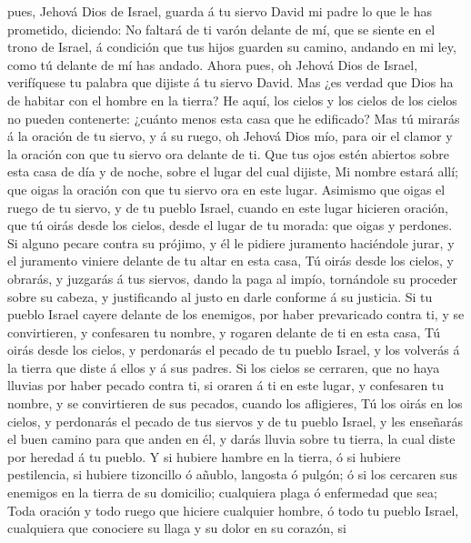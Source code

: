 pues, Jehová Dios de Israel, guarda á tu siervo David mi padre lo que le
has prometido, diciendo: No faltará de ti varón delante de mí, que se
siente en el trono de Israel, á condición que tus hijos guarden su
camino, andando en mi ley, como tú delante de mí has andado.
 Ahora pues, oh Jehová Dios de Israel, verifíquese tu
palabra que dijiste á tu siervo David.  Mas ¿es verdad
que Dios ha de habitar con el hombre en la tierra? He aquí, los cielos y
los cielos de los cielos no pueden contenerte: ¿cuánto menos esta casa
que he edificado?  Mas tú mirarás á la oración de tu
siervo, y á su ruego, oh Jehová Dios mío, para oir el clamor y la
oración con que tu siervo ora delante de ti.  Que tus
ojos estén abiertos sobre esta casa de día y de noche, sobre el lugar
del cual dijiste, Mi nombre estará allí; que oigas la oración con que tu
siervo ora en este lugar.  Asimismo que oigas el ruego de
tu siervo, y de tu pueblo Israel, cuando en este lugar hicieren oración,
que tú oirás desde los cielos, desde el lugar de tu morada: que oigas y
perdones.  Si alguno pecare contra su prójimo, y él le
pidiere juramento haciéndole jurar, y el juramento viniere delante de tu
altar en esta casa,  Tú oirás desde los cielos, y
obrarás, y juzgarás á tus siervos, dando la paga al impío, tornándole su
proceder sobre su cabeza, y justificando al justo en darle conforme á su
justicia.  Si tu pueblo Israel cayere delante de los
enemigos, por haber prevaricado contra ti, y se convirtieren, y
confesaren tu nombre, y rogaren delante de ti en esta casa,
 Tú oirás desde los cielos, y perdonarás el pecado de tu
pueblo Israel, y los volverás á la tierra que diste á ellos y á sus
padres.  Si los cielos se cerraren, que no haya lluvias
por haber pecado contra ti, si oraren á ti en este lugar, y confesaren
tu nombre, y se convirtieren de sus pecados, cuando los afligieres,
 Tú los oirás en los cielos, y perdonarás el pecado de
tus siervos y de tu pueblo Israel, y les enseñarás el buen camino para
que anden en él, y darás lluvia sobre tu tierra, la cual diste por
heredad á tu pueblo.  Y si hubiere hambre en la tierra, ó
si hubiere pestilencia, si hubiere tizoncillo ó añublo, langosta ó
pulgón; ó si los cercaren sus enemigos en la tierra de su domicilio;
cualquiera plaga ó enfermedad que sea;  Toda oración y
todo ruego que hiciere cualquier hombre, ó todo tu pueblo Israel,
cualquiera que conociere su llaga y su dolor en su corazón, si
